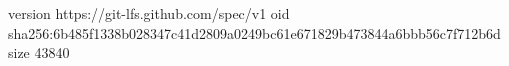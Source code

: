 version https://git-lfs.github.com/spec/v1
oid sha256:6b485f1338b028347c41d2809a0249bc61e671829b473844a6bbb56c7f712b6d
size 43840
